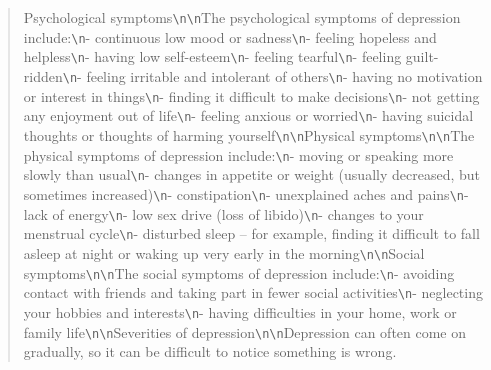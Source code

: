 \begin{quotation}
	\glqq Psychological symptoms\verb!\n!\verb!\n!The psychological symptoms of depression include:\verb!\n!- continuous low mood or sadness\verb!\n!- feeling hopeless and helpless\verb!\n!- having low self-esteem\verb!\n!- feeling tearful\verb!\n!- feeling guilt-ridden\verb!\n!- feeling irritable and intolerant of others\verb!\n!- having no motivation or interest in things\verb!\n!- finding it difficult to make decisions\verb!\n!- not getting any enjoyment out of life\verb!\n!- feeling anxious or worried\verb!\n!- having suicidal thoughts or thoughts of harming yourself\verb!\n!\verb!\n!Physical symptoms\verb!\n!\verb!\n!The physical symptoms of depression include:\verb!\n!- moving or speaking more slowly than usual\verb!\n!- changes in appetite or weight (usually decreased, but sometimes increased)\verb!\n!- constipation\verb!\n!- unexplained aches and pains\verb!\n!- lack of energy\verb!\n!- low sex drive (loss of libido)\verb!\n!- changes to your menstrual cycle\verb!\n!- disturbed sleep – for example, finding it difficult to fall asleep at night or waking up very early in the morning\verb!\n!\verb!\n!Social symptoms\verb!\n!\verb!\n!The social symptoms of depression include:\verb!\n!- avoiding contact with friends and taking part in fewer social activities\verb!\n!- neglecting your hobbies and interests\verb!\n!- having difficulties in your home, work or family life\verb!\n!\verb!\n!Severities of depression\verb!\n!\verb!\n!Depression can often come on gradually, so it can be difficult to notice something is wrong.\grqq
\end{quotation} 


